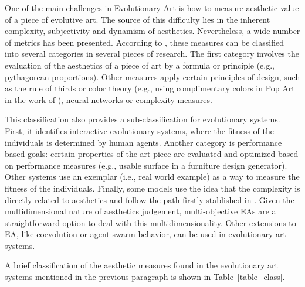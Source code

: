 One of the main challenges in Evolutionary Art is how to measure aesthetic value of a piece of evolutive art. The source of this difficulty lies in the inherent complexity, subjectivity and dynamism of aesthetics. Nevertheless, a wide number of metrics has been presented. According to  \cite{galanter2012computational}, these measures can be classified into several categories in several pieces of research. The first category involves the evaluation of the aesthetics of a piece of art by a formula or principle (e.g., pythagorean proportions). Other measures apply certain principles of design, such as the rule of thirds or color theory (e.g., using complimentary colors in Pop Art in the work of  \cite{den2012evolving}), neural networks or complexity measures. 

This classification also provides a sub-classification for evolutionary systems. First, it identifies interactive evolutionary systems, where the fitness of the individuals is determined by human agents. Another category is performance based goals: certain properties of the art piece are evaluated and optimized based on performance measures (e.g., usable surface in a furniture design generator). Other systems use an exemplar (i.e., real world example) as a way to measure the fitness of the individuals. Finally, some models use the idea that the complexity is directly related to aesthetics and follow the path firstly stablished in \cite{birkhoff2003aesthetic}.  Given the multidimensional nature of aesthetics judgement, multi-objective EAs are a straightforward option to deal with this multidimensionality. Other extensions to EA, like coevolution or agent swarm behavior, can be used in evolutionary art systems.

A brief classification of the aesthetic measures found in the evolutionary art systems mentioned in the previous paragraph is shown in Table~\ref{table_class}.


